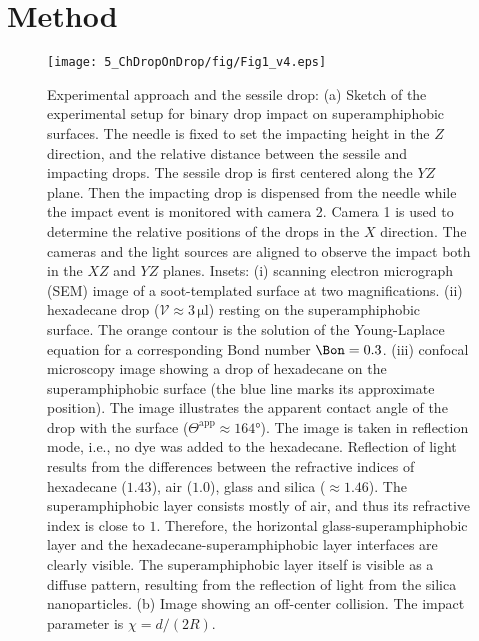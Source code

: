 \section{Method}\label{Ch5:Method}
\begin{figure}
	\centering
	\texttt{[image: 5\_ChDropOnDrop/fig/Fig1\_v4.eps]}
	\caption{Experimental approach and the sessile drop: (a) Sketch of the experimental setup for binary drop impact on superamphiphobic surfaces. The needle is fixed to set the impacting height in the $Z$ direction, and the relative distance between the sessile and impacting drops. The sessile drop is first centered along the $YZ$ plane. Then the impacting drop is dispensed from the needle while the impact event is monitored with camera 2.  Camera 1 is used to determine the relative positions of the drops in the $X$ direction. The cameras and the light sources are aligned to observe the impact both in the $XZ$ and $YZ$ planes. Insets: (i) scanning electron micrograph (SEM) image of a soot-templated surface at two magnifications. (ii) hexadecane drop ($\mathcal{V} \approx 3\,\si{\micro\litre}$) resting on the superamphiphobic surface. The orange contour is the solution of the Young-Laplace equation \cite{book-degennes} for a corresponding Bond number $\Bon = 0.3$.  (iii) confocal microscopy image showing a drop of hexadecane on the superamphiphobic surface (the blue line marks its approximate position). The image illustrates the apparent contact angle of the drop with the surface ($\Theta^{\text{app}} \approx 164\si{\degree}$). The image is taken in reflection mode, i.e., no dye was added to the hexadecane. Reflection of light results from the differences between the refractive indices of hexadecane ($1.43$), air ($1.0$), glass and silica ($\approx 1.46$). The superamphiphobic layer consists mostly of air, and thus its refractive index is close to $1$. Therefore, the horizontal glass-superamphiphobic layer and the hexadecane-superamphiphobic layer interfaces are clearly visible. The superamphiphobic layer itself is visible as a diffuse pattern, resulting from the reflection of light from the silica nanoparticles.  (b) Image showing an off-center collision. The impact parameter is $\chi = d/(2R)$. }
	\label{ChDoD:fig1}
\end{figure}

